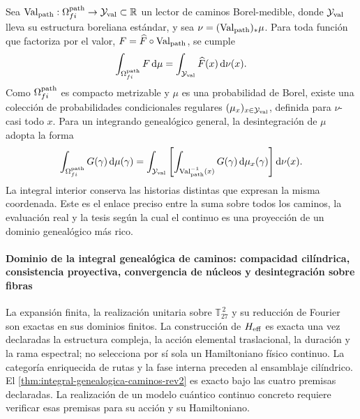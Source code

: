 Sea
\(\operatorname{Val}_{\rm path}:\Omega^{\rm path}_{fi}\to\mathcal Y_{\rm val}\subset\mathbb R\)
un lector de caminos Borel-medible, donde \(\mathcal Y_{\rm val}\) lleva su estructura
boreliana estándar, y sea
\(\nu=(\operatorname{Val}_{\rm path})_*\mu\). Para toda función que
factoriza por el valor, \(F=\widehat F\circ\operatorname{Val}_{\rm path}\),
se cumple
\[
 \int_{\Omega^{\rm path}_{fi}}F\,\mathrm d\mu
 =\int_{\mathcal Y_{\rm val}}\widehat F(x)\,\mathrm d\nu(x).
\]
Como \(\Omega^{\rm path}_{fi}\) es compacto metrizable y \(\mu\) es una
probabilidad de Borel, existe una colección de probabilidades condicionales
regulares \((\mu_x)_{x\in\mathcal Y_{\rm val}}\), definida para \(\nu\)-casi todo \(x\). Para
un integrando genealógico general, la desintegración de \(\mu\) adopta la forma
\begin{equation}
 \int_{\Omega^{\rm path}_{fi}}G(\gamma)\,\mathrm d\mu(\gamma)
 =\int_{\mathcal Y_{\rm val}}\left[
   \int_{\operatorname{Val}_{\rm path}^{-1}(x)}
   G(\gamma)\,\mathrm d\mu_x(\gamma)
  \right]\mathrm d\nu(x).
 \label{eq:desintegracion-genealogica-caminos-rev2}
\end{equation}
La integral interior conserva las historias distintas que expresan la misma
coordenada. Este es el enlace preciso entre la suma sobre todos los caminos,
la evaluación real y la tesis según la cual el continuo es una proyección de
un dominio genealógico más rico.

\paragraph{Dominio de la integral genealógica de caminos: compacidad cilíndrica, consistencia proyectiva, convergencia de núcleos y desintegración sobre fibras}
La expansión finita, la realización unitaria sobre
\(\mathbb T_{27}^{\,2}\) y su reducción de Fourier son exactas en sus dominios
finitos. La construcción de \(H_{\rm eff}\) es
exacta una vez declaradas la estructura compleja, la acción elemental
traslacional, la duración y la rama espectral; no selecciona por sí sola un
Hamiltoniano físico continuo. La categoría enriquecida de rutas y la fase
interna preceden al ensamblaje cilíndrico. El
\cref{thm:integral-genealogica-caminos-rev2} es exacto bajo las cuatro
premisas declaradas. La realización de un modelo cuántico continuo concreto
requiere verificar esas premisas para su acción y su Hamiltoniano.
